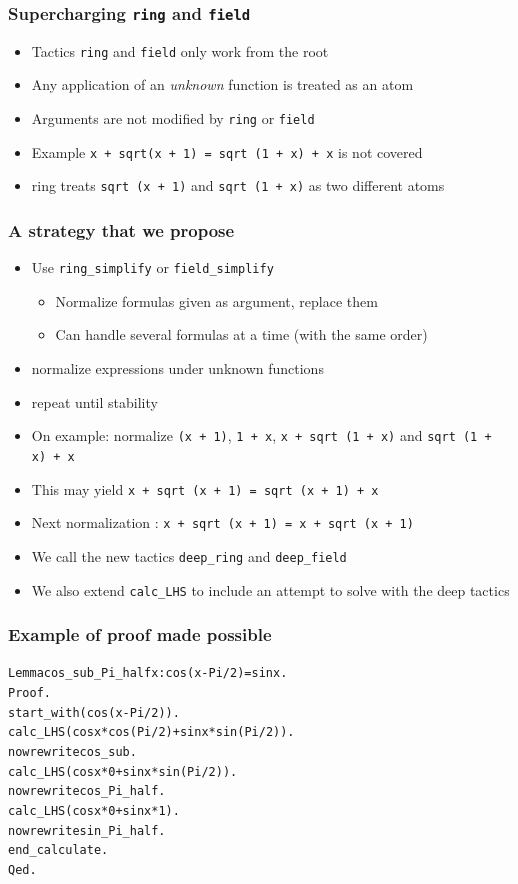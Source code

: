 \documentclass[compress]{beamer}
\begin{document}
\begin{frame}
\frametitle{Supercharging {\tt ring} and {\tt field}}
\begin{itemize}
\item Tactics {\tt ring} and {\tt field} only work from the root
\item Any application of an {\em unknown} function is treated as an atom
\item Arguments are not modified by {\tt ring} or {\tt field}
\item Example {\tt x + sqrt(x + 1) = sqrt (1 + x) + x} is not covered
\item ring treats {\tt sqrt (x + 1)} and {\tt sqrt (1 + x)} as two different atoms
\end{itemize}
\end{frame}
\begin{frame}
\frametitle{A strategy that we propose}
\begin{itemize}
\item Use {\tt ring\_simplify} or {\tt field\_simplify}
\begin{itemize}
\item Normalize formulas given as argument, replace them
\item Can handle several formulas at a time (with the same order)
\end{itemize}
\item normalize expressions under unknown functions
\item repeat until stability
\item On example: normalize {\tt (x + 1)}, {\tt 1 + x}, {\tt x + sqrt (1 + x)}
and {\tt sqrt (1 + x) + x}
\item This may yield {\tt x + sqrt (x + 1) = sqrt (x + 1) + x}
\item Next normalization : {\tt x + sqrt (x + 1) = x + sqrt (x + 1)}
\item We call the new tactics {\tt deep\_ring} and {\tt deep\_field}
\item We also extend {\tt calc\_LHS} to include an attempt to solve with the
  deep tactics
\end{itemize}
\end{frame}
\begin{frame}[fragile]
\frametitle{Example of proof made possible}
\begin{alltt}
Lemma cos_sub_Pi_half x : cos (x - Pi / 2) = sin x.
Proof.
start_with (cos (x - Pi / 2)).
calc_LHS (cos x * cos (Pi / 2) + sin x * sin (Pi / 2)).
  now rewrite cos_sub.
calc_LHS (cos x * 0 + sin x * sin (Pi / 2)).
  now rewrite cos_Pi_half.
calc_LHS (cos x * 0 + sin x * 1).
  now rewrite sin_Pi_half.
end_calculate.
Qed.
\end{alltt}
\end{frame}
\end{document}
